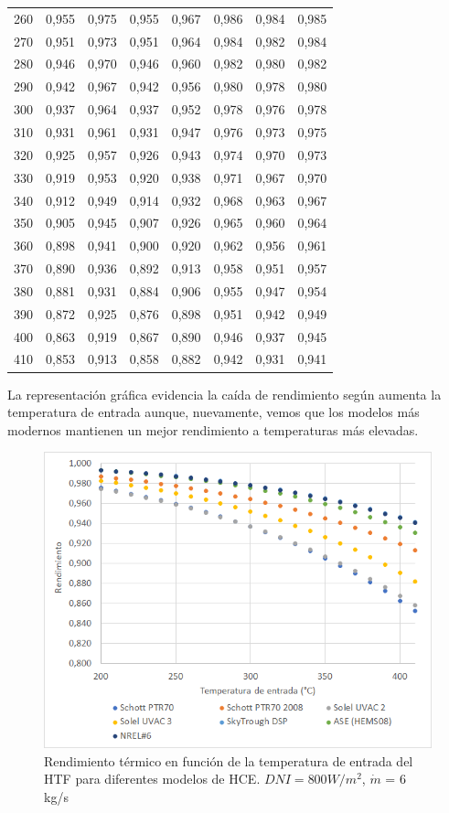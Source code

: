 \begin{longtable}[c]{cccccccc}
260 & 0,955 & 0,975 & 0,955 & 0,967 & 0,986 & 0,984 & 0,985 \\
270 & 0,951 & 0,973 & 0,951 & 0,964 & 0,984 & 0,982 & 0,984 \\
280 & 0,946 & 0,970 & 0,946 & 0,960 & 0,982 & 0,980 & 0,982 \\
290 & 0,942 & 0,967 & 0,942 & 0,956 & 0,980 & 0,978 & 0,980 \\
300 & 0,937 & 0,964 & 0,937 & 0,952 & 0,978 & 0,976 & 0,978 \\
310 & 0,931 & 0,961 & 0,931 & 0,947 & 0,976 & 0,973 & 0,975 \\
320 & 0,925 & 0,957 & 0,926 & 0,943 & 0,974 & 0,970 & 0,973 \\
330 & 0,919 & 0,953 & 0,920 & 0,938 & 0,971 & 0,967 & 0,970 \\
340 & 0,912 & 0,949 & 0,914 & 0,932 & 0,968 & 0,963 & 0,967 \\
350 & 0,905 & 0,945 & 0,907 & 0,926 & 0,965 & 0,960 & 0,964 \\
360 & 0,898 & 0,941 & 0,900 & 0,920 & 0,962 & 0,956 & 0,961 \\
370 & 0,890 & 0,936 & 0,892 & 0,913 & 0,958 & 0,951 & 0,957 \\
380 & 0,881 & 0,931 & 0,884 & 0,906 & 0,955 & 0,947 & 0,954 \\
390 & 0,872 & 0,925 & 0,876 & 0,898 & 0,951 & 0,942 & 0,949 \\
400 & 0,863 & 0,919 & 0,867 & 0,890 & 0,946 & 0,937 & 0,945 \\
410 & 0,853 & 0,913 & 0,858 & 0,882 & 0,942 & 0,931 & 0,941
\end{longtable}

La representación gráfica evidencia la caída de rendimiento según aumenta la temperatura de entrada aunque, nuevamente, vemos que los modelos más modernos mantienen un mejor rendimiento a temperaturas más elevadas.

\begin{figure}[H]
\includegraphics[width=0.9\linewidth]{images/rendimiento_temperatura.png}
\caption[Rendimiento térmico en función de la temperatura de entrada del HTF para diferentes modelos de HCE]{Rendimiento térmico en función de la temperatura de entrada del HTF para diferentes modelos de HCE. $DNI= 800 W/m^2$, $\dot m$ = 6 kg/s} 
\label{fig:test2a}
\end{figure}

